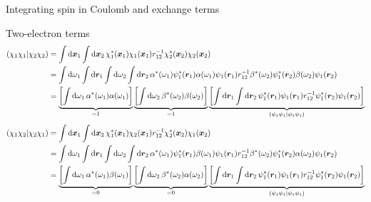 \documentclass[aspectratio=169,9pt]{beamer}
\newcommand{\br}{\boldsymbol{r}}
\newcommand{\bx}{\boldsymbol{x}}
\begin{document}
\begin{frame}{Integrating spin in Coulomb and exchange terms}
	\begin{block}{Two-electron terms}
	\small
		\begin{equation*}
		\begin{split}
			(\chi_1 \chi_1|\chi_2 \chi_2)
			& = \int \dd{\bx_1} \int \dd{\bx_2} \chi_1^*(\bx_1) \chi_1(\bx_1) r_{12}^{-1} \chi_2^*(\bx_2) \chi_2(\bx_2)
			\\
			& = \int \dd{\omega_1} \int \dd{\br_1} \int \dd{\omega_2} \int \dd{\br_2} \alpha^*(\omega_1) \psi_1^*(\br_1) \alpha(\omega_1) \psi_1(\br_1) r_{12}^{-1} \beta^*(\omega_2) \psi_1^*(\br_2) \beta(\omega_2) \psi_1(\br_2)
			\\
			& = \underbrace{\qty[ \int \dd{\omega_1} \alpha^*(\omega_1) \alpha(\omega_1)]}_{=1} 
			\underbrace{\qty[ \int \dd{\omega_2} \beta^*(\omega_2) \beta(\omega_2)]}_{=1} 
			\underbrace{\qty[ \int \dd{\br_1} \int \dd{\br_2} \psi_1^*(\br_1) \psi_1(\br_1) r_{12}^{-1} \psi_1^*(\br_2) \psi_1(\br_2) ]}_{(\psi_1 \psi_1|\psi_1 \psi_1)}
		\end{split}
		\end{equation*}
		\begin{equation*}
		\begin{split}
			(\chi_1 \chi_2|\chi_2 \chi_1)
			& = \int \dd{\bx_1} \int \dd{\bx_2} \chi_1^*(\bx_1) \chi_2(\bx_1) r_{12}^{-1} \chi_2^*(\bx_2) \chi_1(\bx_2)
			\\
			& = \int \dd{\omega_1} \int \dd{\br_1} \int \dd{\omega_2} \int \dd{\br_2} \alpha^*(\omega_1) \psi_1^*(\br_1) \beta(\omega_1) \psi_1(\br_1) r_{12}^{-1} \beta^*(\omega_2) \psi_1^*(\br_2) \alpha(\omega_2) \psi_1(\br_2)
			\\
			& = \underbrace{\qty[ \int \dd{\omega_1} \alpha^*(\omega_1) \beta(\omega_1)]}_{=0} 
			\underbrace{\qty[ \int \dd{\omega_2} \beta^*(\omega_2) \alpha(\omega_2) ]}_{=0} 
			\underbrace{\qty[ \int \dd{\br_1} \int \dd{\br_2} \psi_1^*(\br_1) \psi_1(\br_1) r_{12}^{-1} \psi_1^*(\br_2) \psi_1(\br_2)]}_{(\psi_1 \psi_1|\psi_1 \psi_1)}
		\end{split}
		\end{equation*}
	\end{block}
\end{frame}
\end{document}
